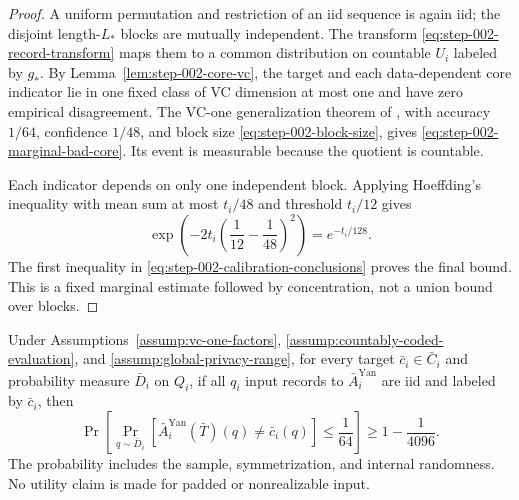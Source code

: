 \begin{proof}
A uniform permutation and restriction of an iid sequence is again iid; the
disjoint length-\(L_*\) blocks are mutually independent.  The transform
\eqref{eq:step-002-record-transform} maps them to a common distribution on
countable \(U_i\) labeled by \(g_*\).  By
Lemma~\ref{lem:step-002-core-vc}, the target and each data-dependent core
indicator lie in one fixed class of VC dimension at most one and have zero
empirical disagreement.  The VC-one generalization theorem of
\citet{yan2025vc1}, with accuracy \(1/64\), confidence \(1/48\), and block
size \eqref{eq:step-002-block-size}, gives
\eqref{eq:step-002-marginal-bad-core}.  Its event is measurable because the
quotient is countable.

Each indicator depends on only one independent block.  Applying Hoeffding's
inequality \citep{hoeffding1963} with mean sum at most \(t_i/48\) and
threshold \(t_i/12\) gives
\[
\exp\!\left(-2t_i\left(\frac1{12}-\frac1{48}\right)^2\right)
=e^{-t_i/128}.
\]
The first inequality in
\eqref{eq:step-002-calibration-conclusions} proves the final bound.  This is
a fixed marginal estimate followed by concentration, not a union bound
over blocks.
\end{proof}

\begin{proposition}
\label{prop:step-002-factor-utility}
Under Assumptions~\ref{assump:vc-one-factors},
\ref{assump:countably-coded-evaluation}, and
\ref{assump:global-privacy-range}, for every target
\(\bar c_i\in\bar C_i\) and probability measure \(\bar D_i\) on \(Q_i\),
if all \(q_i\) input records to \(\bar A_i^{\mathrm{Yan}}\) are iid and
labeled by \(\bar c_i\), then
\begin{equation}\label{eq:step-002-factor-utility}
\Pr\!\left[
\Pr_{q\sim\bar D_i}
[\bar A_i^{\mathrm{Yan}}(\bar T)(q)\ne\bar c_i(q)]
\le\frac1{64}\right]
\ge1-\frac1{4096}.
\end{equation}
The probability includes the sample, symmetrization, and internal randomness.
No utility claim is made for padded or nonrealizable input.
\end{proposition}


